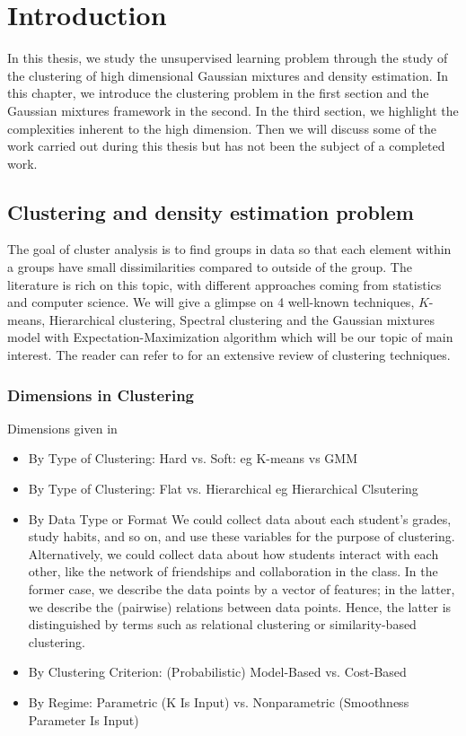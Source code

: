 
\chapter{Introduction\label{chap:intro}}
\minitoc

In this thesis, we study the unsupervised learning problem through the study of the clustering of high dimensional Gaussian mixtures and density estimation. In this chapter, we introduce the clustering problem in the first section and the Gaussian mixtures framework in the second. In the third section, we highlight the complexities inherent to the high dimension. Then we will discuss some of the work carried out during this thesis but has not been the subject of a completed work.

\section{Clustering and density estimation problem}

The goal of cluster analysis is to find groups in data so that each element within a groups have small dissimilarities compared to outside of the group. The literature is rich on this topic, with different approaches coming from statistics and computer science. We will give a glimpse on 4 well-known techniques, $K$-means, Hierarchical clustering, Spectral clustering and the Gaussian mixtures model with Expectation-Maximization algorithm which will be our topic of main interest. The reader can refer to \citep{hennig2015handbook} for an extensive review of clustering techniques.

\subsection{Dimensions in Clustering}
Dimensions given in \citep{hennig2015handbook}

\begin{itemize}
  \item By Type of Clustering: Hard vs. Soft: eg K-means vs GMM
  \item By Type of Clustering: Flat vs. Hierarchical eg Hierarchical Clsutering
  \item By Data Type or Format
  We could collect data about each student’s grades, study habits, and so on, and use these variables for the purpose of clustering. Alternatively, we could collect data about how students interact with each other, like the network of friendships and collaboration in the class. In the former case, we describe the data points by a vector of features; in the latter, we describe the (pairwise) relations between data points. Hence, the latter is distinguished by terms such as relational clustering or similarity-based clustering.
  \item By Clustering Criterion: (Probabilistic) Model-Based vs. Cost-Based
  \item By Regime: Parametric (K Is Input) vs. Nonparametric (Smoothness Parameter Is Input)
\end{itemize}

